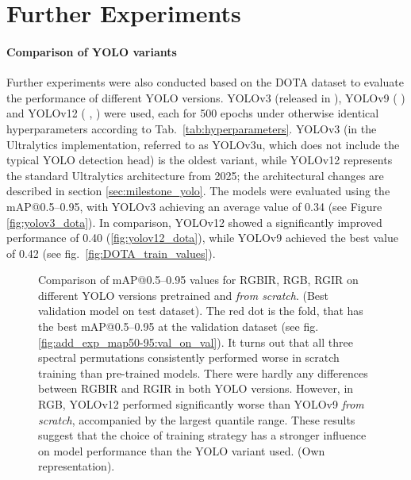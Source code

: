 \section{Further Experiments}


\paragraph{Comparison of YOLO variants} 

Further experiments were also conducted based on the \acrshort{DOTA} dataset to evaluate the performance of different \acrshort{YOLO} versions. \acrshort{YOLO}v3 (released in \citeyear{yolov3_redmon} \cite{yolov3_redmon}), \acrshort{YOLO}v9 (\citeyear{wang2024} \cite{wang2024}) and \acrshort{YOLO}v12 (\citeyear{yolo12} \cite{tian2025}, \cite{yolo12}) were used, each for 500 epochs under otherwise identical hyperparameters according to Tab.~\ref{tab:hyperparameters}. \acrshort{YOLO}v3 (in the Ultralytics implementation, referred to as \acrshort{YOLO}v3u, which does not include the typical \acrshort{YOLO} detection head) is the oldest variant, while \acrshort{YOLO}v12 represents the standard Ultralytics architecture from 2025; the architectural changes are described in section \ref{sec:milestone_yolo}. The models were evaluated using the \acrshort{mAP}@0.5--0.95, with \acrshort{YOLO}v3 achieving an average value of 0.34 (see Figure \ref{fig:yolov3_dota}). In comparison, \acrshort{YOLO}v12 showed a significantly improved performance of 0.40 (\ref{fig:yolov12_dota}), while \acrshort{YOLO}v9 achieved the best value of 0.42 (see fig.~\ref{fig:DOTA_train_values}).


\begin{figure}[htbp]
    \centering
    
    \caption[Comparison of \acrshort{mAP}@0.5--0.95 values for \acrshort{RGBIR}, \acrshort{RGB}, \acrshort{RGIR} on different YOLO versions pretrained and \textit{from scratch} (Best validation model on test dataset)]{Comparison of \acrshort{mAP}@0.5--0.95 values for \acrshort{RGBIR}, \acrshort{RGB}, \acrshort{RGIR} on different YOLO versions pretrained and \textit{from scratch}. (Best validation model on test dataset). The red dot is the fold, that has the best \acrshort{mAP}@0.5--0.95 at the validation dataset (see fig. \ref{fig:add_exp_map50-95:val_on_val}). It turns out that all three spectral permutations consistently performed worse in scratch training than pre-trained models. There were hardly any differences between \acrshort{RGBIR} and \acrshort{RGIR} in both YOLO versions. However, in \acrshort{RGB}, YOLOv12 performed significantly worse than YOLOv9 \textit{from scratch}, accompanied by the largest quantile range. These results suggest that the choice of training strategy has a stronger influence on model performance than the YOLO variant used.  (Own representation).}
    \label{fig:add_exp_map50-95:val_on_test}
\end{figure}



